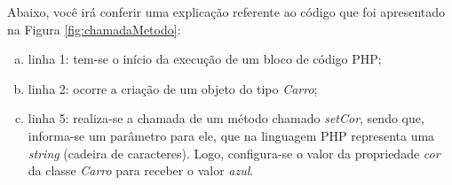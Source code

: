 \FloatBarrier 	%

Abaixo, você irá conferir uma explicação referente ao código que foi
apresentado na Figura \ref{fig:chamadaMetodo}:

\begin{enumerate}[a)]
    \item linha 1: tem-se o início da execução de um bloco de código
    PHP;
    \item linha 2: ocorre a criação de um objeto do tipo \textit{Carro};
    \item linha 5: realiza-se a chamada de um método chamado
    \textit{setCor}, sendo que, informa-se um parâmetro para ele, que na
    linguagem PHP representa uma \textit{string} (cadeira de caracteres). Logo,
    configura-se o valor da propriedade \textit{cor} da classe \textit{Carro}
    para receber o valor \textit{azul}.
\end{enumerate}